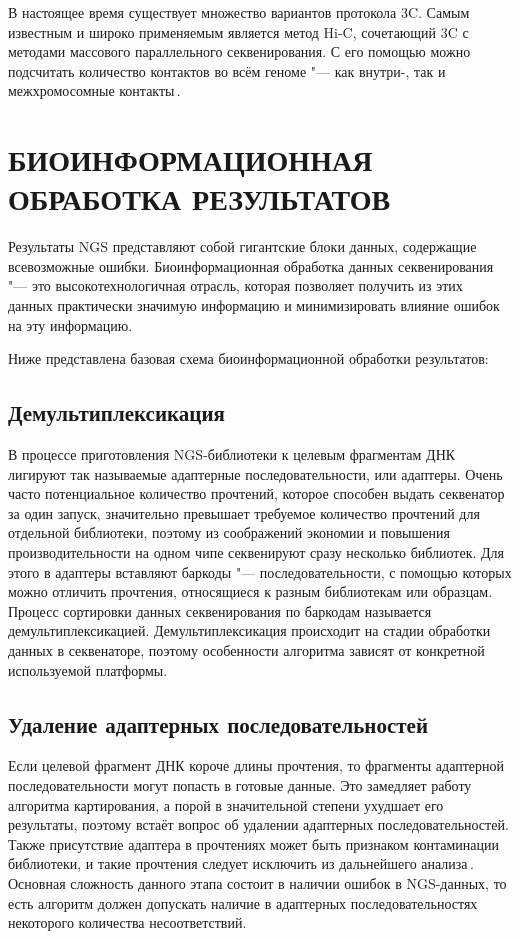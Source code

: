 \documentclass[12pt, twoside, a4paper]{article}
\begin{document}
В настоящее время существует множество вариантов протокола 3C.
Самым известным и широко применяемым является метод Hi-C, сочетающий 3C с методами массового параллельного секвенирования.
С его помощью можно подсчитать количество контактов во всём геноме "--- как внутри-, так и межхромосомные контакты\,\cite{Oluwadare_2019}.

\section*{БИОИНФОРМАЦИОННАЯ ОБРАБОТКА РЕЗУЛЬТАТОВ}

Результаты NGS представляют собой гигантские блоки данных, содержащие всевозможные ошибки.
Биоинформационная обработка данных секвенирования "--- это высокотехнологичная отрасль, которая позволяет получить из этих данных практически значимую информацию и минимизировать влияние ошибок на эту информацию.

Ниже представлена базовая схема биоинформационной обработки результатов:

\subsection*{Демультиплексикация}

В процессе приготовления NGS\hyp{}библиотеки к целевым фрагментам ДНК лигируют так называемые адаптерные последовательности, или адаптеры.
Очень часто потенциальное количество прочтений, которое способен выдать секвенатор за один запуск, значительно превышает требуемое количество прочтений для отдельной библиотеки, поэтому из соображений экономии и повышения производительности на одном чипе секвенируют сразу несколько библиотек.
Для этого в адаптеры вставляют баркоды "--- последовательности, с помощью которых можно отличить прочтения, относящиеся к разным библиотекам или образцам.
Процесс сортировки данных секвенирования по баркодам называется демультиплексикацией.
Демультиплексикация происходит на стадии обработки данных в секвенаторе, поэтому особенности алгоритма зависят от конкретной используемой платформы.

\subsection*{Удаление адаптерных последовательностей}

Если целевой фрагмент ДНК короче длины прочтения, то фрагменты адаптерной последовательности могут попасть в готовые данные.
Это замедляет работу алгоритма картирования, а порой в значительной степени ухудшает его результаты, поэтому встаёт вопрос об удалении адаптерных последовательностей.
Также присутствие адаптера в прочтениях может быть признаком контаминации библиотеки, и такие прочтения следует исключить из дальнейшего анализа\,\cite{Martin_2011}.
Основная сложность данного этапа состоит в наличии ошибок в NGS-данных, то есть алгоритм должен допускать наличие в адаптерных последовательностях некоторого количества несоответствий.
\end{document}
